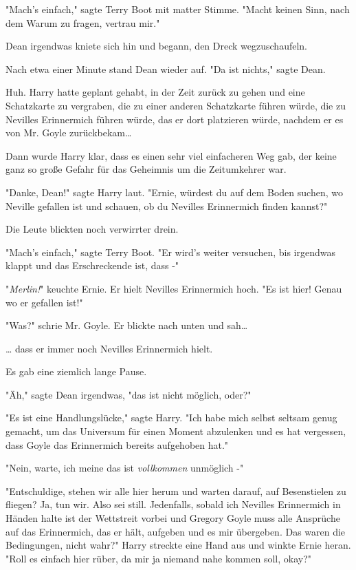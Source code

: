 {"Mach's einfach," sagte Terry Boot mit matter Stimme. "Macht keinen Sinn, nach dem Warum zu fragen, vertrau mir."

Dean irgendwas kniete sich hin und begann, den Dreck wegzuschaufeln.

Nach etwa einer Minute stand Dean wieder auf. "Da ist nichts," sagte Dean.

Huh. Harry hatte geplant gehabt, in der Zeit zurück zu gehen und eine Schatzkarte zu vergraben, die zu einer anderen Schatzkarte führen würde, die zu Nevilles Erinnermich führen würde, das er dort platzieren würde, nachdem er es von Mr. Goyle zurückbekam…

Dann wurde Harry klar, dass es einen sehr viel einfacheren Weg gab, der keine ganz so große Gefahr für das Geheimnis um die Zeitumkehrer war.

"Danke, Dean!" sagte Harry laut. "Ernie, würdest du auf dem Boden suchen, wo Neville gefallen ist und schauen, ob du Nevilles Erinnermich finden kannst?"

Die Leute blickten noch verwirrter drein.

"Mach's einfach," sagte Terry Boot. "Er wird's weiter versuchen, bis irgendwas klappt und das Erschreckende ist, dass -"

"\emph{Merlin!}" keuchte Ernie. Er hielt Nevilles Erinnermich hoch. "Es ist hier! Genau wo er gefallen ist!"

"Was?" schrie Mr. Goyle. Er blickte nach unten und sah…

… dass er immer noch Nevilles Erinnermich hielt.

Es gab eine ziemlich lange Pause.

"Äh," sagte Dean irgendwas, "das ist nicht möglich, oder?"

"Es ist eine Handlungslücke," sagte Harry. "Ich habe mich selbst seltsam genug gemacht, um das Universum für einen Moment abzulenken und es hat vergessen, dass Goyle das Erinnermich bereits aufgehoben hat."

"Nein, warte, ich meine das ist \emph{vollkommen} unmöglich -"

"Entschuldige, stehen wir alle hier herum und warten darauf, auf Besenstielen zu fliegen? Ja, tun wir. Also sei still. Jedenfalls, sobald ich Nevilles Erinnermich in Händen halte ist der Wettstreit vorbei und Gregory Goyle muss alle Ansprüche auf das Erinnermich, das er hält, aufgeben und es mir übergeben. Das waren die Bedingungen, nicht wahr?" Harry streckte eine Hand aus und winkte Ernie heran. "Roll es einfach hier rüber, da mir ja niemand nahe kommen soll, okay?"

}
